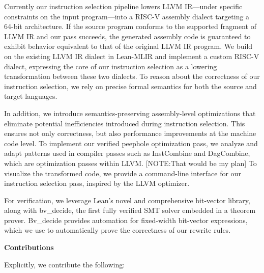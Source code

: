 Currently our instruction selection pipeline lowers LLVM IR—under specific constraints on the input program—into a RISC-V assembly dialect targeting a 64-bit architecture. If the source program conforms to the supported fragment of LLVM IR and our pass succeeds, the generated assembly code is guaranteed to exhibit behavior equivalent to that of the original LLVM IR program. We build on the existing LLVM IR dialect in Lean-MLIR and implement a custom RISC-V dialect, expressing the core of our instruction selection as a lowering transformation between these two dialects. To reason about the correctness of our instruction selection, we rely on precise formal semantics for both the source and target languages. 

In addition, we introduce semantics-preserving assembly-level optimizations that eliminate potential inefficiencies introduced during instruction selection. This ensures not only correctness, but also performance improvements at the machine code level. To implement our verified peephole optimization pass, we analyze and adapt patterns used in compiler passes such as InstCombine and DagCombine, which are optimization passes within LLVM. [NOTE:That would be my plan]
To visualize the transformed code, we provide a command-line interface for our instruction selection pass, inspired by the LLVM optimizer. 

For verification, we leverage Lean’s novel and comprehensive bit-vector library, along with bv\_decide, the first fully verified SMT solver embedded in a theorem prover. Bv\_decide provides automation for fixed-width bit-vector expressions, which we use to automatically prove the correctness of our rewrite rules.

\textbf{Contributions}

Explicitly, we contribute the following:

